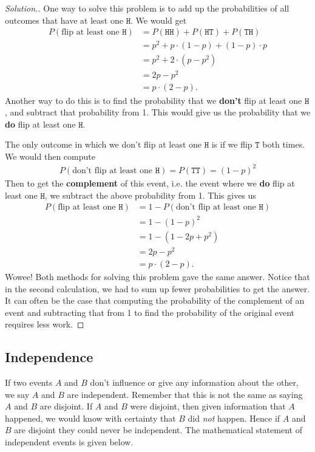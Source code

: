 \documentclass{tufte-book}
\newcommand\hd{\texttt{H}}
\newcommand\tl{\texttt{T}}
\theoremstyle{definition}
\numberwithin{theorem}{section}
\numberwithin{definition}{section}
\numberwithin{lemma}{section}
\numberwithin{corollary}{section}
\numberwithin{proposition}{section}
\numberwithin{remark}{section}
\numberwithin{claim}{section}
\numberwithin{observation}{section}
\numberwithin{fact}{section}
\numberwithin{assumption}{section}
\numberwithin{example}{section}
\numberwithin{exercise}{section}
\begin{document}
\begin{proof}[Solution.]
One way to solve this problem is to add up the probabilities of all outcomes that have at least one $\hd$. We would get
\begin{align*}
P(\text{flip at least one }\hd) &= P(\hd \hd) + P(\hd \tl) + P(\tl \hd) \\
&= p^2 + p \cdot (1-p) + (1-p) \cdot p \\
&= p^2 + 2 \cdot (p-p^2) \\
&= 2p - p^2 \\
&= p \cdot (2-p).
\end{align*}
Another way to do this is to find the probability that we \textbf{don't} flip at least one $\hd$, and subtract that probability from 1. This would give us the probability that we \textbf{do} flip at least one $\hd$. 

The only outcome in which we don't flip at least one $\hd$ is if we flip $\tl$ both times. We would then compute
\begin{align*}
P(\text{don't flip at least one }\hd) = P(\tl \tl) = (1-p)^2
\end{align*}
Then to get the \textbf{complement} of this event, i.e. the event where we \textbf{do} flip at least one $\hd$, we subtract the above probability from 1. This gives us
\begin{align*}
P(\text{flip at least one } \hd) &= 1 - P(\text{don't flip at least one }\hd) \\
&= 1 - (1-p)^2 \\
&= 1 - (1 - 2p + p^2) \\
&= 2p - p^2 \\
&= p\cdot (2 - p).
\end{align*}
Wowee! Both methods for solving this problem gave the same answer. Notice that in the second calculation, we had to sum up fewer probabilities to get the answer. It can often be the case that computing the probability of the complement of an event and subtracting that from 1 to find the probability of the original event requires less work. 
\end{proof}


\subsection{Independence}
If two events $A$ and $B$ don't influence or give any information about the other, we say $A$ and $B$ are independent. Remember that this is not the same as saying $A$ and $B$ are disjoint. If $A$ and $B$ were disjoint, then given information that $A$ happened, we would know with certainty that $B$ did \textit{not} happen. Hence if $A$ and $B$ are disjoint they could never be independent. The mathematical statement of independent events is given below.
\end{document}
